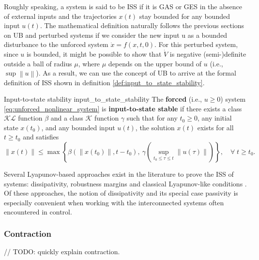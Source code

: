 Roughly speaking, a system is said to be ISS if it is GAS or GES in the absence of external inputs and the trajectories $x \left( t \right)$ stay bounded for any bounded input $u \left( t \right)$. The mathematical definition naturally follows the previous sections on UB and perturbed systems if we consider the new input u as a bounded disturbance to the unforced system $\dot{ x }= f \left( x, t, 0 \right)$. For this perturbed system, since $u$ is bounded, it might be possible to show that $\dot{ V }$ is negative (semi-)definite outside a ball of radius $\mu$, where $\mu$ depends on the upper bound of $u$ (i.e., $\sup{\left\|u\right\|}$). As a result, we can use the concept of UB to arrive at the formal definition of ISS shown in definition \ref{def:input_to_state_stability}.

\begin{definition}[list text=Input-to-state stability,after pre=\footnotetext{Definition 4.4 of \cite{khalilNonlinearControl2015} was slightly changed for consistency with the rest of the text.}]{Input-to-state stability \cite{khalilNonlinearControl2015}\footnotemark}{input_to_state_stability}
  The \textbf{forced} (i.e., $u \ge 0$) system \eqref{eq:unforced_nonlinear_system} is \textbf{input-to-state stable} if there exists a class $\mathcal{KL}$ function $\beta$ and a class $\mathcal{K}$ function $\gamma$ such that for any $t_0 \geq 0$, any initial state $x \left( t_0 \right)$, and any bounded input $u\left( t \right)$, the solution $x \left( t \right)$ exists for all $t \geq t_0$ and satisfies
  \begin{equation}
    \left\|x\left(t\right)\right\| \le \max \left\{ \beta\left(\left\|x\left(t_0 \right)\right\|, t-t_0\right), \ \gamma \left(\sup_{t_0 \leq \tau \leq t}{\left\|u\left(\tau \right)\right\|} \right)\right\}, \quad \forall \; t \geq t_0.
  \end{equation}
\end{definition}

Several Lyapunov-based approaches exist in the literature to prove the ISS of systems: dissipativity, robustness margins and classical Lyapunov-like conditions \cite{khalilNonlinearSystems2002,sontagInputtoStateStabilityProperty1995}. Of these approaches, the notion of dissipativity and its special case passivity is especially convenient when working with the interconnected systems often encountered in control.

\subsubsection{Contraction}
// TODO: quickly explain contraction.


